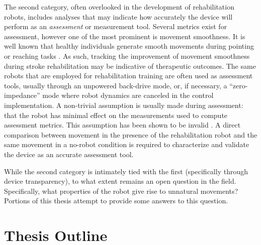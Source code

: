     The second category, often overlooked in the development of rehabilitation robots, includes analyses that may indicate how accurately the device will perform as an \textit{assessment} or measurement tool. Several metrics exist for assessment, however one of the most prominent is movement smoothness. It is well known that healthy individuals generate smooth movements during pointing or reaching tasks \cite{gordon1994,flash1985,morasso1981}. As such, tracking the improvement of movement smoothness during stroke rehabilitation may be indicative of therapeutic outcomes. The same robots that are employed for rehabilitation training are often used as assessment tools, usually through an unpowered back-drive \cite{yozbatiran2012} mode, or, if necessary, a ``zero-impedance'' mode where robot dynamics are canceled in the control implementation. A non-trivial assumption is usually made during assessment: that the robot has minimal effect on the measurements used to compute assessment metrics. This assumption has been shown to be invalid \cite{rose2015,erwin2017,rose2017}. A direct comparison between movement in the presence of the rehabilitation robot and the same movement in a no-robot condition is required to characterize and validate the device as an accurate assessment tool.

    While the second category is intimately tied with the first (specifically through device transparency), to what extent remains an open question in the field. Specifically, what properties of the robot give rise to unnatural movements? Portions of this thesis attempt to provide some answers to this question.





    \section{Thesis Outline} \label{sec:outline}

